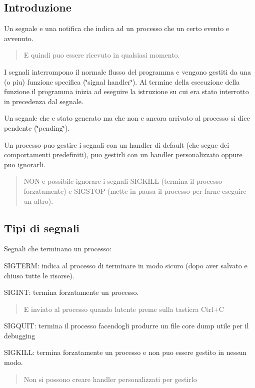 \subsection*{Introduzione}

Un segnale e\textquotesingle{} una notifica che indica ad un processo che un certo evento e\textquotesingle{} avvenuto. \begin{quote}
E quindi puo\textquotesingle{} essere ricevuto in qualsiasi momento. \end{quote}


I segnali interrompono il normale flusso del programma e vengono gestiti da una (o piu\textquotesingle{}) funzione specifica (\char`\"{}signal handler\char`\"{}). Al termine della esecuzione della funzione il programma inizia ad eseguire la istruzione su cui era stato interrotto in precedenza dal segnale.

Un segnale che e\textquotesingle{} stato generato ma che non e\textquotesingle{} ancora arrivato al processo si dice pendente (\char`\"{}pending\char`\"{}).

Un processo puo\textquotesingle{} gestire i segnali con un handler di default (che segue dei comportamenti predefiniti), puo\textquotesingle{} gestirli con un handler personalizzato oppure puo\textquotesingle{} ignorarli. \begin{quote}
N\+ON e\textquotesingle{} possibile ignorare i segnali {\ttfamily S\+I\+G\+K\+I\+LL} (termina il processo forzatamente) e {\ttfamily S\+I\+G\+S\+T\+OP} (mette in pausa il processo per farne eseguire un altro). \end{quote}


\subsection*{Tipi di segnali}

Segnali che terminano un processo\+:
\begin{DoxyItemize}
\item {\ttfamily S\+I\+G\+T\+E\+RM}\+: indica al processo di terminare in modo sicuro (dopo aver salvato e chiuso tutte le risorse).
\item {\ttfamily S\+I\+G\+I\+NT}\+: termina forzatamente un processo. \begin{quote}
E\textquotesingle{} inviato al processo quando l\textquotesingle{}utente preme sulla tastiera {\ttfamily Ctrl+C} \end{quote}

\item {\ttfamily S\+I\+G\+Q\+U\+IT}\+: termina il processo facendogli produrre un file core dump utile per il debugging
\item {\ttfamily S\+I\+G\+K\+I\+LL}\+: termina forzatamente un processo e non puo\textquotesingle{} essere gestito in nessun modo. \begin{quote}
Non si possono creare handler personalizzati per gestirlo \end{quote}

\end{DoxyItemize}

